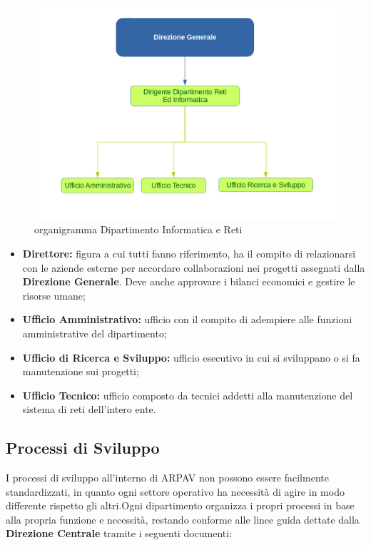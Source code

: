 \begin{figure}[htbp]
	\centering
	\includegraphics[scale=0.4]{./capitoli/capitolo1/img/organigrammaDip}
	\caption{organigramma Dipartimento Informatica e Reti}
\end{figure}

\begin{itemize}

	\item \textbf{Direttore:} figura a cui tutti fanno riferimento, ha il compito di relazionarsi con le aziende esterne per accordare collaborazioni nei progetti assegnati dalla \textbf{Direzione Generale}. Deve anche approvare i bilanci economici e gestire le risorse umane;
	\item \textbf{Ufficio Amministrativo:} ufficio con il compito di adempiere alle funzioni amministrative del dipartimento;
	\item \textbf{Ufficio di Ricerca e Sviluppo:} ufficio esecutivo in cui si sviluppano o si fa manutenzione sui progetti;
	\item \textbf{Ufficio Tecnico:} ufficio composto da tecnici addetti alla manutenzione del sistema di reti dell'intero ente.
	
\end{itemize}
\subsection{Processi di Sviluppo}


I processi di sviluppo all'interno di  ARPAV non possono essere facilmente standardizzati, in quanto ogni settore operativo ha necessità di agire in modo differente rispetto gli altri.Ogni dipartimento organizza i propri processi in base alla propria funzione e necessità, restando conforme alle linee guida dettate dalla \textbf{Direzione Centrale} tramite i seguenti documenti: 

